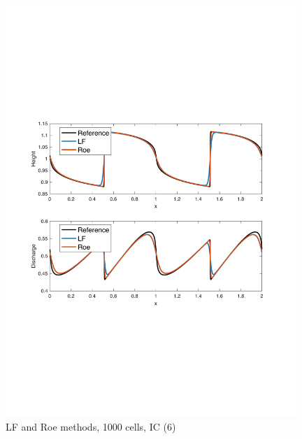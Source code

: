 \documentclass[11pt,a4paper]{article}
\begin{document}
\begin{figure}[!htb]
    \centering
    \includegraphics[width=11cm]{pictures/IC_3_1000_cells.pdf}
    \caption{LF and Roe methods, 1000 cells, IC (6)}
    \label{fig:IC_3_1000_cells}
\end{figure}
\end{document}
